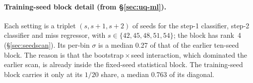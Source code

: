 \paragraph{Training-seed block detail (from \S\ref{sec:uq-ml}).} Each setting is a triplet $(s,s{+}1,s{+}2)$ of seeds for the step-1 classifier, step-2 classifier and miss regressor, with $s\in\{42,45,48,51,54\}$; the block has rank~4 (\S\ref{sec:seedscan}). Its per-bin $\sigma$ is a median 0.27 of that of the earlier ten-seed block. The reason is that the bootstrap\,$\times$\,seed interaction, which dominated the earlier scan, is already inside the fixed-seed statistical block. The training-seed block carries it only at its $1/20$ share, a median 0.763 of its diagonal.



